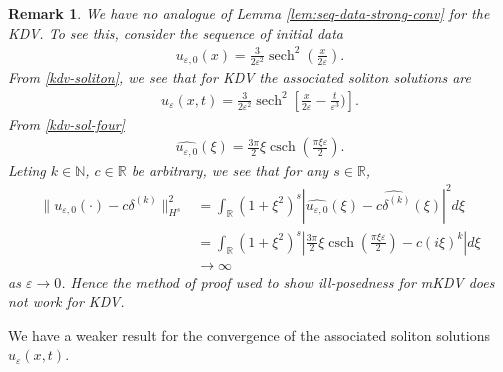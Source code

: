 \documentclass[12pt,reqno]{amsart}
\numberwithin{equation}{section}  %
\newcommand{\rr}{\mathbb{R}}
\newcommand{\wh}{\widehat}
\newcommand{\ee}{\varepsilon}
\DeclareMathOperator{\sech}{sech}
\DeclareMathOperator{\csch}{csch}
\newtheorem{remark}[theorem]{Remark}
\begin{document}
\begin{framed}
  \begin{remark}
    We have no analogue of Lemma \ref{lem:seq-data-strong-conv} for the KDV. To
    see this, consider the sequence of initial data 
    \begin{equation*}
    \begin{split}
      u_{\ee,0}(x) = \frac{3}{2\ee^{2}}\sech^{2}\left(
      \frac{x}{2 \ee} \right).
    \end{split}
    \end{equation*}
    From \eqref{kdv-soliton}, we see that for KDV the associated soliton
    solutions are
    \begin{equation*}
    \begin{split}
      u_{\ee}(x,t) = \frac{3}{2\ee^{2}}
      \sech^{2}\left[ \frac{x}{2 \ee} - \frac{t}{\ee^{3}})
        \right].
    \end{split}
    \end{equation*}
    From \eqref{kdv-sol-four}
    \begin{equation*}
    \begin{split}
      \wh{u_{\ee, 0}}(\xi) = \frac{3 \pi}{2} \xi \csch\left( \frac{\pi \xi
      \ee}{2} \right).
    \end{split}
    \end{equation*}
    Leting
    $k \in \mathbb{N}$, $c \in \rr$ be arbitrary, we see that for any $s \in \rr$,
    \begin{equation*}
    \begin{split}
      \| u_{\ee,0}(\cdot) - c \delta^{(k)} \|_{H^{s}}^{2}
      & = \int_{\rr}
      (1 + \xi^{2})^{s} | \wh{u_{\ee,0}}(\xi) - \wh{c \delta^{(k)}}(\xi)
      |^{2} d \xi
      \\
      & =  \int_{\rr} (1 + \xi^{2})^{s} | \frac{3 \pi}{2} \xi \csch\left(
      \frac{\pi \xi \ee}{2} \right) - c(i \xi)^{k}
       | d \xi
       \\
       & \to \infty 
    \end{split}
    \end{equation*}
    as $\ee \to 0$.
    Hence the method of proof used to show ill-posedness for
    mKDV does not work for KDV. 
    
    \end{remark}
  \end{framed}
          We have a weaker result for the convergence of the associated soliton
          solutions $u_{\ee}(x,t)$.
\end{document}
